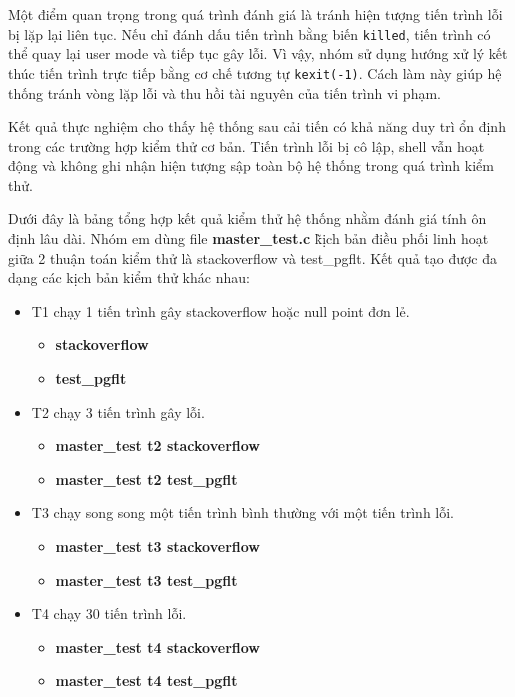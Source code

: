 Một điểm quan trọng trong quá trình đánh giá là tránh hiện tượng tiến trình lỗi bị lặp lại liên tục. Nếu chỉ đánh dấu tiến trình bằng biến \texttt{killed}, tiến trình có thể quay lại user mode và tiếp tục gây lỗi. Vì vậy, nhóm sử dụng hướng xử lý kết thúc tiến trình trực tiếp bằng cơ chế tương tự \texttt{kexit(-1)}. Cách làm này giúp hệ thống tránh vòng lặp lỗi và thu hồi tài nguyên của tiến trình vi phạm.

Kết quả thực nghiệm cho thấy hệ thống sau cải tiến có khả năng duy trì ổn định trong các trường hợp kiểm thử cơ bản. Tiến trình lỗi bị cô lập, shell vẫn hoạt động và không ghi nhận hiện tượng sập toàn bộ hệ thống trong quá trình kiểm thử.

Dưới đây là bảng tổng hợp kết quả kiểm thử hệ thống nhằm đánh giá tính ôn định lâu dài. Nhóm em dùng file \textbf{master\_test.c} \~
kịch bản điều phối linh hoạt giữa 2 thuận toán kiểm thử là stackoverflow và test\_pgflt. Kết quả tạo được đa dạng các kịch bản kiểm thử khác nhau:
\begin{itemize}
    \item T1 chạy 1 tiến trình gây stackoverflow hoặc null point đơn lẻ.
    \begin{itemize}
        \item \textbf{stackoverflow}
        \item \textbf{ test\_pgflt}
    \end{itemize}
    \item T2 chạy 3 tiến trình gây lỗi.
    \begin{itemize}
        \item \textbf{master\_test t2 stackoverflow}
        \item \textbf{ master\_test t2 test\_pgflt}
    \end{itemize}
    \item T3 chạy song song một tiến trình bình thường với một tiến trình lỗi.
    \begin{itemize}
        \item \textbf{master\_test t3 stackoverflow}
        \item \textbf{master\_test t3 test\_pgflt}
    \end{itemize}
    \item T4 chạy 30 tiến trình lỗi.
    \begin{itemize}
        \item \textbf{master\_test t4 stackoverflow}
        \item \textbf{master\_test t4 test\_pgflt}
    \end{itemize}
\end{itemize}

